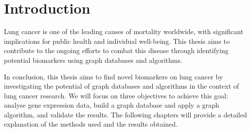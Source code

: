 \section{Introduction} \label{sec:intro}
Lung cancer is one of the leading causes of mortality worldwide, with significant implications for public health and individual well-being.
This thesis aims to contribute to the ongoing efforts to combat this disease through
identifying potential biomarkers using graph databases and algorithms.











In conclusion, this thesis aims to find novel biomarkers on lung cancer
by investigating the potential of graph databases and algorithms in the context of lung cancer research.
We will focus on three objectives to achieve this goal:
analyse gene expression data, build a graph database and apply a graph algorithm, and validate the results.
The following chapters will provide a detailed explanation of the methods used and the results obtained.

